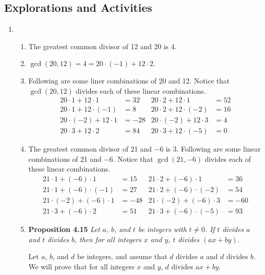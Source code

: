 \subsection*{Explorations and Activities}
\setcounter{oldenumi}{\theenumi}
\begin{enumerate} \setcounter{enumi}{\theoldenumi}
\item \begin{enumerate}
\item The greatest common divisor of 12 and 20 is 4.

\item $\gcd(20, 12) = 4 = 20\cdot (-1) + 12 \cdot 2$.

\item Following are some liner combinations of 20 and 12. Notice that $\gcd(20, 12)$ divides each of these linear combinations.
\begin{align*}
20 \cdot 1 + 12 \cdot 1 &= 32  & 20 \cdot 2 + 12 \cdot 1 &= 52 \\
20 \cdot 1 + 12 \cdot (-1) &= 8 & 20 \cdot 2 + 12 \cdot (-2) &= 16 \\
20 \cdot (-2) + 12 \cdot 1 &= -28 & 20 \cdot (-2) + 12 \cdot 3 &= 4 \\
20 \cdot 3 + 12 \cdot 2 &= 84  &  20 \cdot 3 + 12 \cdot (-5) &= 0
\end{align*}

\item The greatest common divisor of 21 and $-6$ is 3.  Following are some linear combinations of 21 and $-6$.  Notice that $\gcd(21, -6)$ divides each of these linear combinations.
\begin{align*}
21 \cdot 1 + (-6) \cdot 1 &= 15  & 21 \cdot 2 + (-6) \cdot 1 &= 36 \\
21 \cdot 1 + (-6) \cdot (-1) &= 27 & 21 \cdot 2 + (-6) \cdot (-2) &= 54 \\
21 \cdot (-2) + (-6) \cdot 1 &= -48 & 21 \cdot (-2) + (-6) \cdot 3 &= -60 \\
21 \cdot 3 + (-6) \cdot 2 &= 51  &  21 \cdot 3 + (-6) \cdot (-5) &= 93
\end{align*}

\item \textbf{Proposition 4.15} \emph{Let $a$, $b$, and $t$ be integers with $t \ne 0$.  If $t$ divides $a$ and $t$ divides $b$, then for all integers $x$ and $y$, $t$ divides 
$(ax + by)$}.

\begin{myproof}
Let $a$, $b$, and  $d$  be integers, and assume that $d$  divides  $a$  and  $d$  divides  $b$.  We will prove that for all integers  $x$  and  $y$,  $d$  divides  $ax + by$.


\end{myproof}
\end{enumerate}
\end{enumerate}
